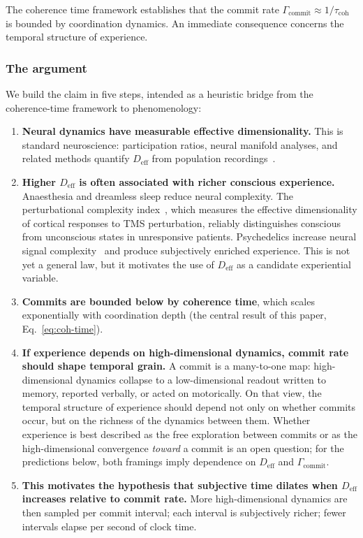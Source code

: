 \documentclass[12pt]{article}
\newcommand{\Deff}{D_{\mathrm{eff}}}
\begin{document}
The coherence time framework establishes that the commit rate
$\Gamma_{\mathrm{commit}} \approx 1/\tau_{\mathrm{coh}}$ is bounded by coordination
dynamics. An immediate consequence concerns the temporal structure of experience.

\subsubsection{The argument}

We build the claim in five steps, intended as a heuristic bridge from the coherence-time framework to phenomenology:

\begin{enumerate}
\item \textbf{Neural dynamics have measurable effective dimensionality.}
This is standard neuroscience: participation ratios, neural manifold analyses, and
related methods quantify $\Deff$ from population recordings~\cite{stringer2019,cunningham2014}.

\item \textbf{Higher $\Deff$ is often associated with richer conscious experience.}
Anaesthesia and dreamless sleep reduce neural complexity. The perturbational complexity
index~\cite{casali2013}, which measures the effective dimensionality of cortical responses
to TMS perturbation, reliably distinguishes conscious from unconscious states in
unresponsive patients. Psychedelics increase neural signal complexity~\cite{timmermann2019,carhart2014}
and produce subjectively enriched experience. This is not yet a general law, but it
motivates the use of $\Deff$ as a candidate experiential variable.

\item \textbf{Commits are bounded below by coherence time}, which scales exponentially
with coordination depth (the central result of this paper, Eq.~\ref{eq:coh-time}).

\item \textbf{If experience depends on high-dimensional dynamics, commit rate should shape temporal grain.}
A commit is a many-to-one map: high-dimensional dynamics collapse to a low-dimensional
readout written to memory, reported verbally, or acted on motorically. On that view, the
temporal structure of experience should depend not only on whether commits occur, but on
the richness of the dynamics between them. Whether experience is best described as the free
exploration between commits or as the high-dimensional convergence \emph{toward} a commit
is an open question; for the predictions below, both framings imply dependence on $\Deff$
and $\Gamma_{\mathrm{commit}}$.

\item \textbf{This motivates the hypothesis that subjective time dilates when $\Deff$ increases relative to commit rate.}
More high-dimensional dynamics are then sampled per commit interval; each interval is
subjectively richer; fewer intervals elapse per second of clock time.
\end{enumerate}
\end{document}

